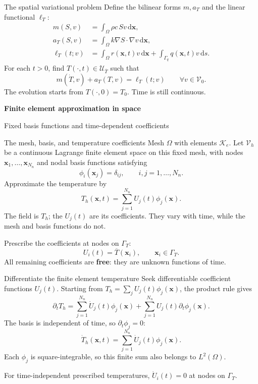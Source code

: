 \documentclass[11pt,aspectratio=169]{beamer}
\newcommand{\dd}{\mathrm d}
\newcommand{\bx}{\bm x}
\newcommand{\Vzero}{\mathcal V_0}
\begin{document}
\begin{frame}{The spatial variational problem}
Define the bilinear forms $m,a_T$ and the linear functional $\ell_T$:
\[
\begin{aligned}
m(S,v)&=\int_\Omega\rho c\,Sv\,\dd\bx,\\
a_T(S,v)&=\int_\Omega k\nabla S\cdot\nabla v\,\dd\bx,\\
\ell_T(t;v)&=\int_\Omega r(\bx,t)v\,\dd\bx
+\int_{\Gamma_q}q(\bx,t)v\,\dd s.
\end{aligned}
\]
For each $t>0$, find $T(\cdot,t)\in\mathcal U_{\overline T}$ such that
\[
\boxed{m(\dot T,v)+a_T(T,v)=\ell_T(t;v)
\qquad\forall v\in\Vzero.}
\]
The evolution starts from $T(\cdot,0)=T_0$.
Time is still continuous.
\end{frame}

\begin{frame}
\centering\vfill
{\LARGE\bfseries Finite element approximation in space\par}
\vspace{0.4cm}
Fixed basis functions and time-dependent coefficients
\vfill
\end{frame}

\begin{frame}{The mesh, basis, and temperature coefficients}
Mesh $\Omega$ with elements $\mathcal K_e$.
Let $\mathcal V_h$ be a continuous Lagrange finite element space on this fixed mesh,
with nodes $\bx_1,\ldots,\bx_{N_n}$ and nodal basis functions satisfying
\[
\phi_i(\bx_j)=\delta_{ij},\qquad i,j=1,\ldots,N_n.
\]
Approximate the temperature by
\[
\boxed{T_h(\bx,t)=\sum_{j=1}^{N_n}U_j(t)\phi_j(\bx).}
\]
The field is $T_h$; the $U_j(t)$ are its coefficients.
They vary with time, while the mesh and basis functions do not.
\medskip

Prescribe the coefficients at nodes on $\Gamma_T$:
\[
U_i(t)=\overline T(\bx_i),\qquad \bx_i\in\Gamma_T.
\]
All remaining coefficients are \textbf{free}: they are unknown functions of time.
\end{frame}

\begin{frame}{Differentiate the finite element temperature}
Seek differentiable coefficient functions $U_j(t)$.
Starting from $T_h=\sum_jU_j(t)\phi_j(\bx)$, the product rule gives
\[
\partial_tT_h
=\sum_{j=1}^{N_n}\dot U_j(t)\phi_j(\bx)
+\sum_{j=1}^{N_n}U_j(t)\partial_t\phi_j(\bx).
\]
The basis is independent of time, so $\partial_t\phi_j=0$:
\[
\boxed{\dot T_h(\bx,t)=\sum_{j=1}^{N_n}\dot U_j(t)\phi_j(\bx).}
\]
Each $\phi_j$ is square-integrable, so this finite sum also belongs to $L^2(\Omega)$.
\medskip

For time-independent prescribed temperatures,
$\dot U_i(t)=0$ at nodes on $\Gamma_T$.
\end{frame}
\end{document}
